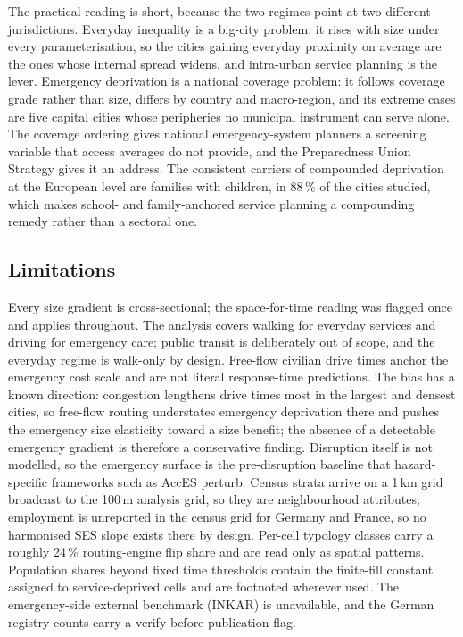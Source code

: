 \documentclass[11pt]{article}
\begin{document}
The practical reading is short, because the two regimes point at two
different jurisdictions. Everyday inequality is a big-city problem: it
rises with size under every parameterisation, so the cities gaining
everyday proximity on average are the ones whose internal spread widens,
and intra-urban service planning is the lever. Emergency deprivation is a
national coverage problem: it follows coverage grade rather than size,
differs by country and macro-region, and its extreme cases are five
capital cities whose peripheries no municipal instrument can serve alone.
The coverage ordering gives national emergency-system planners a
screening variable that access averages do not provide, and the
Preparedness Union Strategy gives it an address. The consistent carriers
of compounded deprivation at the European level are families with
children, in 88\,\% of the cities studied, which makes school- and
family-anchored service planning a compounding remedy rather than a
sectoral one.

\subsection{Limitations}\label{sec:limitations}

Every size gradient is cross-sectional; the space-for-time reading was
flagged once and applies throughout. The analysis covers walking for
everyday services and driving for emergency care; public transit is
deliberately out of scope, and the everyday regime is walk-only by
design. Free-flow civilian drive times anchor the emergency cost scale and
are not literal response-time predictions. The bias has a known direction:
congestion lengthens drive times most in the largest and densest cities,
so free-flow routing understates emergency deprivation there and pushes
the emergency size elasticity toward a size benefit; the absence of a
detectable emergency gradient is therefore a conservative finding.
Disruption itself is not modelled, so the emergency surface is the
pre-disruption baseline that hazard-specific frameworks such as AccES
\citep{pagancajigas2026acces} perturb. Census
strata arrive on a 1\,km grid broadcast to the 100\,m analysis grid, so
they are neighbourhood attributes; employment is unreported in the census
grid for Germany and France, so no harmonised SES slope exists there by
design. Per-cell typology classes carry a roughly 24\,\% routing-engine
flip share and are read only as spatial patterns. Population shares beyond
fixed time thresholds contain the finite-fill constant assigned to
service-deprived cells and are footnoted wherever used. The emergency-side
external benchmark (INKAR) is unavailable, and the German registry counts
carry a verify-before-publication flag.
\end{document}
